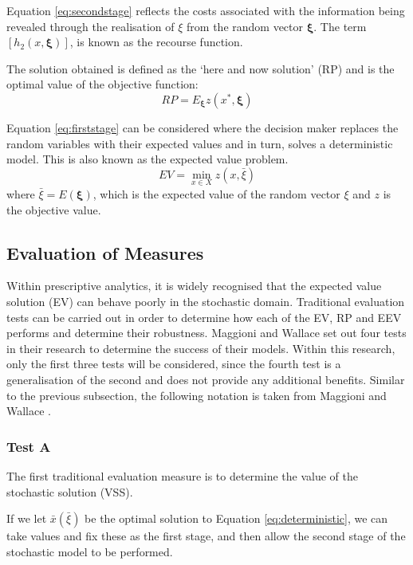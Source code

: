 \documentclass[../thesis.tex]{subfiles}
\begin{document}
Equation \eqref{eq:secondstage} reflects the costs associated with the information being revealed through the realisation of $\xi$ from the random vector $\boldsymbol{\xi}$. The term $\left[h_2(x, \boldsymbol{\xi})\right]$, is known as the recourse function. 

The solution obtained is defined as the `here and now solution' (RP) and is the optimal value of the objective function:
\begin{equation}
    RP = E_{\boldsymbol{\xi}} z(x^{*},\boldsymbol{\xi})
\end{equation}

Equation \eqref{eq:firststage} can be considered where the decision maker replaces the random variables with their expected values and in turn, solves a deterministic model. This is also known as the expected value problem.
\begin{equation}\label{eq:deterministic}
    EV = \min_{x\in X} z(x, \bar\xi)
\end{equation}
where $\bar \xi = E(\boldsymbol{\xi})$, which is the expected value of the random vector $\xi$ and $z$ is the objective value.

\subsection{Evaluation of Measures}
Within prescriptive analytics, it is widely recognised that the expected value solution (EV) can behave poorly in the stochastic domain. Traditional evaluation tests can be carried out in order to determine how each of the EV, RP and EEV performs and determine their robustness. Maggioni and Wallace \cite{Maggioni2010} set out four tests in their research to determine the success of their models. Within this research, only the first three tests will be considered, since the fourth test is a generalisation of the second and does not provide any additional benefits. Similar to the previous subsection, the following notation is taken from Maggioni and Wallace \cite{Maggioni2010}.

\subsubsection{Test A}\label{sec:TestA}
The first traditional evaluation measure is to determine the value of the stochastic solution (VSS).

If we let $\bar x (\bar\xi)$ be the optimal solution to Equation \eqref{eq:deterministic}, we can take values and fix these as the first stage, and then allow the second stage of the stochastic model to be performed.
\end{document}
